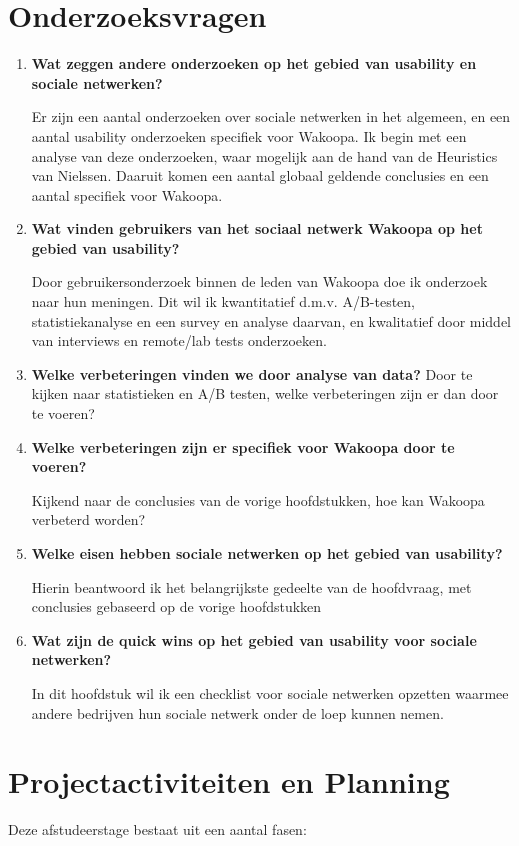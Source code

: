 \documentclass[a4paper, 10pt, pdftex]{article}
\begin{document}
\section{Onderzoeksvragen}
\begin{enumerate}
\item
 \textbf{Wat zeggen andere onderzoeken op het gebied van usability en sociale netwerken?}

Er zijn een aantal onderzoeken over sociale netwerken in het algemeen, en een aantal usability onderzoeken specifiek voor Wakoopa. Ik begin met een analyse van deze onderzoeken, waar mogelijk aan de hand van de Heuristics van Nielssen. Daaruit komen een aantal globaal geldende conclusies en een aantal specifiek voor Wakoopa.

\item
\textbf{Wat vinden gebruikers van het sociaal netwerk Wakoopa op het gebied van usability?}

Door gebruikersonderzoek binnen de leden van Wakoopa doe ik onderzoek naar hun meningen. Dit wil ik kwantitatief d.m.v. A/B-testen, statistiekanalyse en een survey en analyse daarvan, en kwalitatief door middel van interviews en remote/lab tests onderzoeken.

\item
\textbf{Welke verbeteringen vinden we door analyse van data?}
Door te kijken naar statistieken en A/B testen, welke verbeteringen zijn er dan door te voeren?

\item
\textbf{Welke verbeteringen zijn er specifiek voor Wakoopa door te voeren?}

Kijkend naar de conclusies van de vorige hoofdstukken, hoe kan Wakoopa verbeterd worden?

\item
\textbf{Welke eisen hebben sociale netwerken op het gebied van usability?}

Hierin beantwoord ik het belangrijkste gedeelte van de hoofdvraag, met conclusies gebaseerd op de vorige hoofdstukken

\item
\textbf{Wat zijn de quick wins op het gebied van usability voor sociale netwerken?}

In dit hoofdstuk wil ik een checklist voor sociale netwerken opzetten waarmee andere bedrijven hun sociale netwerk onder de loep kunnen nemen.
\end{enumerate}

\section{Projectactiviteiten en Planning}
Deze afstudeerstage bestaat uit een aantal fasen:
\end{document}
